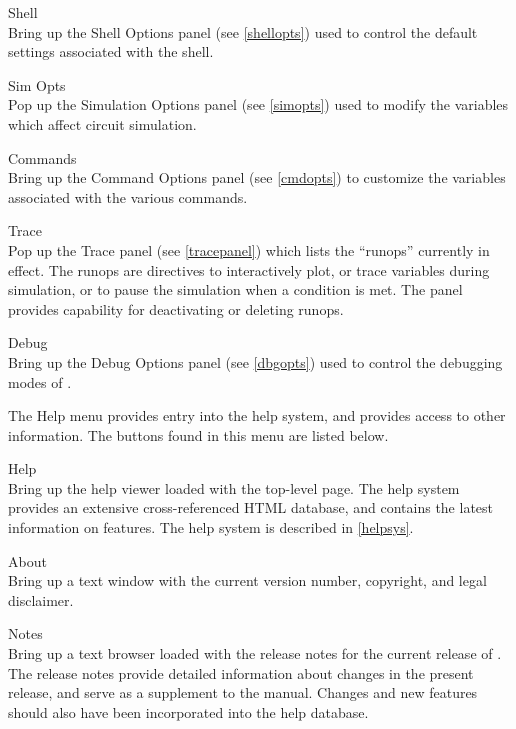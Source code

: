 \begin{description}
\item{\cb Shell}\\
Bring up the {\cb Shell Options} panel (see \ref{shellopts}) used to
control the default settings associated with the {\WRspice} shell.

\item{\cb Sim Opts}\\
Pop up the {\cb Simulation Options} panel (see \ref{simopts}) used
to modify the variables which affect circuit simulation.

\item{\cb Commands}\\
Bring up the {\cb Command Options} panel (see \ref{cmdopts}) to
customize the variables associated with the various commands.

\item{\cb Trace}\\
Pop up the {\cb Trace} panel (see \ref{tracepanel}) which lists the
``runops'' currently in effect.  The runops are directives to
interactively plot, or trace variables during simulation, or to pause
the simulation when a condition is met.  The panel provides capability
for deactivating or deleting runops.

\item{\cb Debug}\\
Bring up the {\cb Debug Options} panel (see \ref{dbgopts}) used to
control the debugging modes of {\WRspice}.
\end{description}

The {\cb Help} menu provides entry into the help system, and provides
access to other information.  The buttons found in this menu are listed
below.

\begin{description}
\item{\cb Help}\\
Bring up the help viewer loaded with the top-level page.  The help
system provides an extensive cross-referenced HTML database, and
contains the latest information on {\WRspice} features.  The help
system is described in \ref{helpsys}.

\item{\cb About}\\
Bring up a text window with the current {\WRspice} version number,
copyright, and legal disclaimer.

\item{\cb Notes}\\
Bring up a text browser loaded with the release notes for the current
release of {\WRspice}.  The release notes provide detailed information
about changes in the present release, and serve as a supplement to the
manual.  Changes and new features should also have been incorporated
into the help database.
\end{description}

